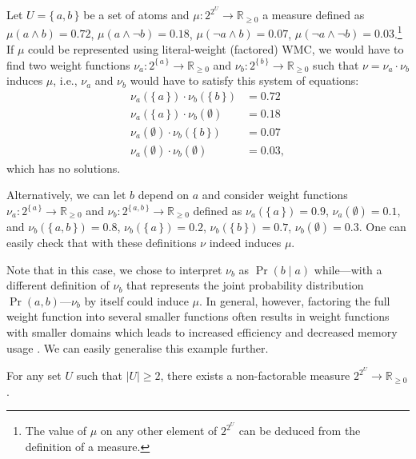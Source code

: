 \begin{example}
  Let $U = \{\, a, b \,\}$ be a set of atoms and
  $\mu\colon 2^{2^U} \to \mathbb{R}_{\ge 0}$ a measure defined as
  $\mu(a \land b) = 0.72$, $\mu(a \land \neg b) = 0.18$,
  $\mu(\neg a \land b) = 0.07$, $\mu(\neg a \land \neg b) = 0.03$.\footnote{The
    value of $\mu$ on any other element of $2^{2^U}$ can be deduced from the
    definition of a measure.} If $\mu$ could be represented using literal-weight
  (factored) WMC, we would have to find two weight functions
  $\nu_a\colon 2^{\{\, a \,\}} \to \mathbb{R}_{\ge 0}$ and
  $\nu_b\colon 2^{\{\, b \,\}} \to \mathbb{R}_{\ge 0}$ such that
  $\nu = \nu_a \cdot \nu_b$ induces $\mu$, i.e., $\nu_a$ and $\nu_b$ would have
  to satisfy this system of equations:
  \begin{align*}
    \nu_a(\{\, a \,\}) \cdot \nu_b(\{\, b \,\}) &= 0.72 \\
    \nu_a(\{\, a \,\}) \cdot \nu_b(\emptyset) &= 0.18 \\
    \nu_a(\emptyset) \cdot \nu_b(\{\, b \,\}) &= 0.07 \\
    \nu_a(\emptyset) \cdot \nu_b(\emptyset) &= 0.03,
  \end{align*}
  which has no solutions.

  Alternatively, we can let $b$ depend on $a$ and consider weight functions
  $\nu_a\colon 2^{\{\, a \,\}} \to \mathbb{R}_{\ge 0}$ and
  $\nu_b\colon 2^{\{\, a, b \,\}} \to \mathbb{R}_{\ge 0}$ defined as
  $\nu_a(\{\, a \,\}) = 0.9$, $\nu_a(\emptyset) = 0.1$, and
  $\nu_b(\{\, a, b \,\}) = 0.8$, $\nu_b(\{\, a \,\}) = 0.2$,
  $\nu_b(\{\, b \,\}) = 0.7$, $\nu_b(\emptyset) = 0.3$. One can easily check
  that with these definitions $\nu$ indeed induces $\mu$.
\end{example}

Note that in this case, we chose to interpret $\nu_b$ as $\Pr(b \mid a)$
while---with a different definition of $\nu_b$ that represents the joint
probability distribution $\Pr(a, b)$---$\nu_b$ by itself could induce $\mu$. In
general, however, factoring the full weight function into several smaller
functions often results in weight functions with smaller domains which leads to
increased efficiency and decreased memory usage
\citep{DBLP:conf/aaai/DudekPV20}. We can easily generalise this example further.

\begin{theorem}
  For any set $U$ such that $|U| \ge 2$, there exists a non-factorable measure
  $2^{2^{U}} \to \mathbb{R}_{\ge 0}$.
\end{theorem}

